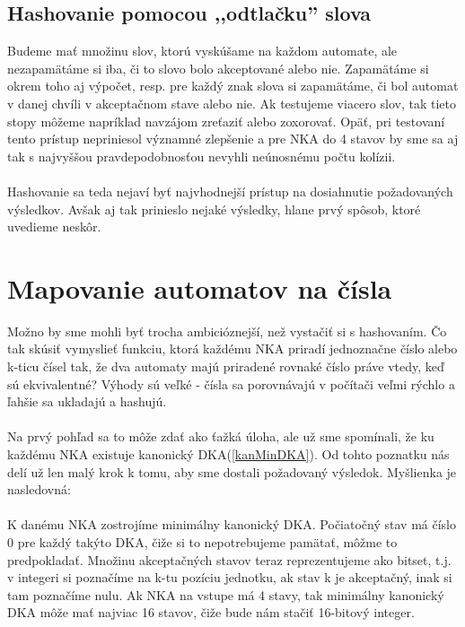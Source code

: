 \subsection{Hashovanie pomocou ,,odtlačku'' slova}
Budeme mať množinu slov, ktorú vyskúšame na každom automate, ale nezapamätáme si iba, či to slovo bolo akceptované alebo nie. Zapamätáme si okrem toho aj výpočet, resp. pre každý znak slova si zapamätáme, či bol automat v danej chvíli v akceptačnom stave alebo nie. Ak testujeme viacero slov, tak tieto stopy môžeme napríklad navzájom zreťaziť alebo zoxorovať. Opäť, pri testovaní tento prístup nepriniesol významné zlepšenie a pre NKA do 4 stavov by sme sa aj tak s najvyššou pravdepodobnosťou nevyhli neúnosnému počtu kolízii.

\paragraph{}
Hashovanie sa teda nejaví byť najvhodnejší prístup na dosiahnutie požadovaných výsledkov. Avšak aj tak prinieslo nejaké výsledky, hlane prvý spôsob, ktoré uvedieme neskôr.

\label{mapCis}
\section{Mapovanie automatov na čísla}

Možno by sme mohli byť trocha ambicióznejší, než vystačiť si s hashovaním. Čo tak skúsiť vymyslieť funkciu, ktorá každému NKA priradí jednoznačne číslo alebo k-ticu čísel tak, že dva automaty majú priradené rovnaké číslo práve vtedy, keď sú ekvivalentné? Výhody sú veľké - čísla sa porovnávajú v počítači veľmi rýchlo a ľahšie sa ukladajú a hashujú. 
\paragraph{}
Na prvý pohľad sa to môže zdať ako ťažká úloha, ale už sme spomínali, že ku každému NKA existuje kanonický DKA(\ref{kanMinDKA}). Od tohto poznatku nás delí už len malý krok k tomu, aby sme dostali požadovaný výsledok. Myšlienka je nasledovná:
\paragraph{}
K danému NKA zostrojíme minimálny kanonický DKA. Počiatočný stav má číslo 0 pre každý takýto DKA, čiže si to nepotrebujeme pamätať, môžme to predpokladať. Množinu akceptačných stavov teraz reprezentujeme ako bitset, t.j. v integeri si poznačíme na k-tu pozíciu jednotku, ak stav k je akceptačný, inak si tam poznačíme nulu. Ak NKA na vstupe má 4 stavy, tak minimálny kanonický DKA môže mať najviac 16 stavov, čiže bude nám stačiť 16-bitový integer. 
